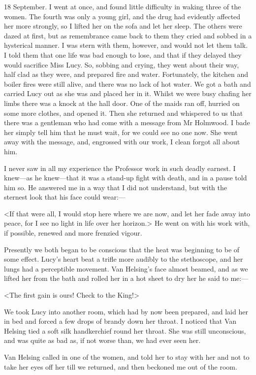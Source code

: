 \begin{diary}{18 September.}
I went at once, and found little difficulty in waking three of the women. The fourth was only a young girl, and the drug had evidently affected her more strongly, so I lifted her on the sofa and let her sleep. The others were dazed at first, but as remembrance came back to them they cried and sobbed in a hysterical manner. I was stern with them, however, and would not let them talk. I told them that one life was bad enough to lose, and that if they delayed they would sacrifice Miss Lucy. So, sobbing and crying, they went about their way, half clad as they were, and prepared fire and water. Fortunately, the kitchen and boiler fires were still alive, and there was no lack of hot water. We got a bath and carried Lucy out as she was and placed her in it. Whilst we were busy chafing her limbs there was a knock at the hall door. One of the maids ran off, hurried on some more clothes, and opened it. Then she returned and whispered to us that there was a gentleman who had come with a message from Mr Holmwood. I bade her simply tell him that he must wait, for we could see no one now. She went away with the message, and, engrossed with our work, I clean forgot all about him.

I never saw in all my experience the Professor work in such deadly earnest. I knew—as he knew—that it was a stand-up fight with death, and in a pause told him so. He answered me in a way that I did not understand, but with the sternest look that his face could wear:—

<If that were all, I would stop here where we are now, and let her fade away into peace, for I see no light in life over her horizon.> He went on with his work with, if possible, renewed and more frenzied vigour.

Presently we both began to be conscious that the heat was beginning to be of some effect. Lucy's heart beat a trifle more audibly to the stethoscope, and her lungs had a perceptible movement. Van Helsing's face almost beamed, and as we lifted her from the bath and rolled her in a hot sheet to dry her he said to me:—

<The first gain is ours! Check to the King!>

We took Lucy into another room, which had by now been prepared, and laid her in bed and forced a few drops of brandy down her throat. I noticed that Van Helsing tied a soft silk handkerchief round her throat. She was still unconscious, and was quite as bad as, if not worse than, we had ever seen her.

Van Helsing called in one of the women, and told her to stay with her and not to take her eyes off her till we returned, and then beckoned me out of the room.


\end{diary}
